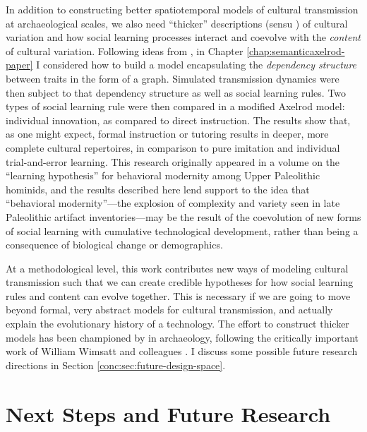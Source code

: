 In addition to constructing better spatiotemporal models of cultural transmission at archaeological scales, we also need ``thicker'' descriptions (sensu \citealt{Geertz1973,gilbert1949concept}) of cultural variation and how social learning processes interact and coevolve with the \emph{content} of cultural variation.  Following ideas from \citet{mesoudi2008learning}, in Chapter \ref{chap:semanticaxelrod-paper} I considered how to build a model encapsulating the \emph{dependency structure} between traits in the form of a graph.  Simulated transmission dynamics were then subject to that dependency structure as well as social learning rules.  Two types of social learning rule were then compared in a modified Axelrod model:  individual innovation, as compared to direct instruction.  The results show that, as one might expect, formal instruction or tutoring results in deeper, more complete cultural repertoires, in comparison to pure imitation and individual trial-and-error learning.  This research originally appeared in a volume on the ``learning hypothesis'' for behavioral modernity among Upper Paleolithic hominids, and the results described here lend support to the idea that ``behavioral modernity''---the explosion of complexity and variety seen in late Paleolithic artifact inventories---may be the result of the coevolution of new forms of social learning with cumulative technological development, rather than being a consequence of biological change or demographics.

At a methodological level, this work contributes new ways of modeling cultural transmission such that we can create credible hypotheses for how social learning rules and content can evolve together.  This is necessary if we are going to move beyond formal, very abstract models for cultural transmission, and actually explain the evolutionary history of a technology.  The effort to construct thicker models has been championed by \citet{tostevin2019content} in archaeology, following the critically important work of William Wimsatt and colleagues \citep{wimsatt2007reproducing,wimsatt2019articulating}.  I discuss some possible future research directions in Section \ref{conc:sec:future-design-space}.

\section{Next Steps and Future Research}\label{conc:sec:future-research}

